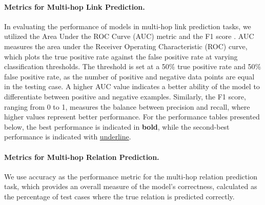 \documentclass[pmlr]{jmlr}%
\begin{document}
\paragraph{Metrics for Multi-hop Link Prediction.}In evaluating the performance of models in multi-hop link prediction tasks, we utilized the Area Under the ROC Curve (AUC) metric \citep{AUC} and the F1 score \citep{F1}. AUC measures the area under the Receiver Operating Characteristic (ROC) curve, which plots the true positive rate against the false positive rate at varying classification thresholds. The threshold is set at a 50\% true positive rate and 50\% false positive rate, as the number of positive and negative data points are equal in the testing case.
A higher AUC value indicates a better ability of the model to differentiate between positive and negative examples. Similarly, the F1 score, ranging from 0 to 1, measures the balance between precision and recall, where higher values represent better performance. For the performance tables presented below, the best performance is indicated in \textbf{bold}, while the second-best performance is indicated with \underline{underline}.

\paragraph{Metrics for Multi-hop Relation Prediction.}
We use accuracy as the performance metric for the multi-hop relation prediction task, which provides an overall measure of the model's correctness, calculated as the percentage of test cases where the true relation is predicted correctly.

\end{document}
